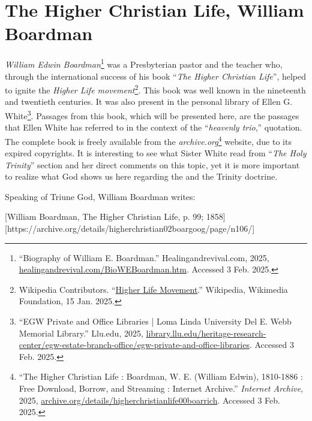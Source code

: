 \section*{The Higher Christian Life, William Boardman}

\textit{William Edwin Boardman}\footnote{“Biography of William E. Boardman.” Healingandrevival.com, 2025, \href{https://healingandrevival.com/BioWEBoardman.htm}{healingandrevival.com/BioWEBoardman.htm}. Accessed 3 Feb. 2025.} was a Presbyterian pastor and the teacher who, through the international success of his book “\textit{The Higher Christian Life}”, helped to ignite the \textit{Higher Life movement}\footnote{Wikipedia Contributors. “\href{https://en.wikipedia.org/wiki/Higher_Life_movement}{Higher Life Movement}.” Wikipedia, Wikimedia Foundation, 15 Jan. 2025.}. This book was well known in the nineteenth and twentieth centuries. It was also present in the personal library of Ellen G. White\footnote{“EGW Private and Office Libraries | Loma Linda University Del E. Webb Memorial Library.” Llu.edu, 2025, \href{https://library.llu.edu/heritage-research-center/egw-estate-branch-office/egw-private-and-office-libraries?combine_op=contains&combine=Higher+Christian+Life}{library.llu.edu/heritage-research-center/egw-estate-branch-office/egw-private-and-office-libraries}. Accessed 3 Feb. 2025.}. Passages from this book, which will be presented here, are the passages that Ellen White has referred to in the context of the “\textit{heavenly trio},” quotation. The complete book is freely available from the \textit{archive.org}\footnote{“The Higher Christian Life : Boardman, W. E. (William Edwin), 1810-1886 : Free Download, Borrow, and Streaming : Internet Archive.” \textit{Internet Archive}, 2025, \href{https://archive.org/details/higherchristianlife00boarrich?view=theater\#page/98/mode/2up}{archive.org/details/higherchristianlife00boarrich}. Accessed 3 Feb. 2025.} website, due to its expired copyrights. It is interesting to see what Sister White read from “\textit{The Holy Trinity}” section and her direct comments on this topic, yet it is more important to realize what God shows us here regarding the  and the Trinity doctrine.

Speaking of Triune God, William Boardman writes:

[William Boardman, The Higher Christian Life, p. 99; 1858][https://archive.org/details/higherchristian02boargoog/page/n106/]

